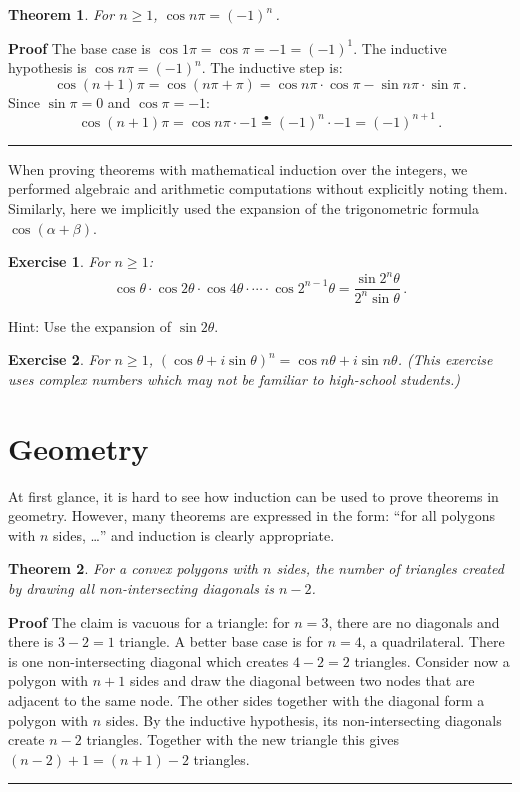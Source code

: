 \documentclass[11pt,a4paper]{report}
\newcommand*{\ih}{\stackrel{\bullet}{=}}
\newcommand*{\qed}{\hfill\rule{1ex}{1.5ex}}
\newcommand*{\qedd}[1]{\vspace*{-#1ex}\qed}
\newtheorem{theorem}{Theorem}
\newtheorem{exercise}{Exercise}
\begin{document}
\begin{theorem}\label{t.cos}
For $n\geq 1$, $\cos n\pi = (-1)^n$\,.
\end{theorem}

\textbf{Proof} The base case is $\cos 1\pi = \cos \pi = -1 = (-1)^1$. The inductive hypothesis is $\cos n\pi = (-1)^n$. The inductive step is:
\[
\cos (n+1)\pi = \cos (n\pi + \pi) = \cos n\pi \cdot \cos \pi - \sin n\pi \cdot \sin \pi\,.
\]
Since $\sin \pi = 0$ and $\cos \pi = -1$:
\[
\cos (n+1)\pi = \cos n\pi \cdot -1 \ih{} (-1)^n \cdot -1 = (-1)^{n+1}\,.
\]

\qedd{5}

When proving theorems with mathematical induction over the integers, we performed algebraic and arithmetic computations without explicitly noting them. Similarly, here we implicitly used the expansion of the trigonometric formula $\cos (\alpha+\beta)$.

\begin{exercise}
For $n\geq 1$:
\[
\cos\theta \cdot \cos 2\theta \cdot \cos 4\theta \cdot \cdots \cdot \cos 2^{n-1}\theta = \frac{\sin 2^n\theta}{2^n \sin \theta}\,.
\]
\end{exercise}
Hint: Use the expansion of $\sin 2\theta$.

\begin{exercise}
For $n\geq 1$, $(\cos \theta + i\sin\theta)^n = \cos n\theta + i\sin n\theta$. (This exercise uses complex numbers which may not be familiar to high-school students.)
\end{exercise}

\section{Geometry}

At first glance, it is hard to see how induction can be used to prove theorems in geometry. However, many theorems are expressed in the form: ``for all polygons with $n$ sides, \ldots'' and induction is clearly appropriate.

\begin{theorem}\label{t.diag}
For a convex polygons with $n$ sides, the number of triangles created by drawing all \emph{non-intersecting} diagonals is $n-2$.
\end{theorem}

\textbf{Proof} The claim is vacuous for a triangle: for $n=3$, there are no diagonals and there is $3-2=1$ triangle. A better base case is for $n=4$, a quadrilateral. There is one non-intersecting diagonal which creates $4-2=2$ triangles. Consider now a polygon with $n+1$ sides and draw the diagonal between two nodes that are adjacent to the same node. The other sides together with the diagonal form a polygon with $n$ sides. By the inductive hypothesis, its non-intersecting diagonals create $n-2$ triangles. Together with the new triangle this gives $(n-2)+1=(n+1)-2$ triangles.\qed
\end{document}
